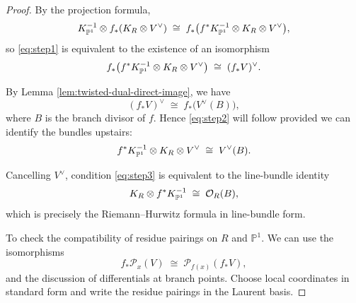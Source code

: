 \documentclass[12pt]{article}
\begin{document}
\begin{proof}
    By the projection formula,
    \[
        K_{\P^1}^{-1}\otimes f_*(K_R\otimes V^\vee)
        \;\cong\;
        f_*\bigl(f^*K_{\P^1}^{-1}\otimes K_R\otimes V^\vee\bigr),
    \]
    so \eqref{eq:step1} is equivalent to the existence of an isomorphism
    \begin{equation}\label{eq:step2}
        f_*\bigl(f^*K_{\P^1}^{-1}\otimes K_R\otimes V^\vee\bigr)
        \;\cong\;
        (f_*V)^\vee.
    \end{equation}

    By Lemma \ref{lem:twisted-dual-direct-image}, we have
    \[
        (f_*V)^\vee \;\cong\; f_*\bigl(V^\vee(B)\bigr),
    \]
    where $B$ is the branch divisor of $f$.
    Hence \eqref{eq:step2} will follow provided we can identify the bundles upstairs:
    \begin{equation}\label{eq:step3}
        f^*K_{\P^1}^{-1}\otimes K_R\otimes V^\vee
        \;\cong\;
        V^\vee(B).
    \end{equation}

    Cancelling $V^\vee$, condition \eqref{eq:step3} is equivalent to the line-bundle identity
    \begin{equation}\label{eq:RH}
        K_R\otimes f^*K_{\P^1}^{-1}
        \;\cong\;
        \cO_R(B),
    \end{equation}
    which is precisely the Riemann--Hurwitz formula in line-bundle form.

    To check the compatibility of residue pairings on $R$ and $\mathbb{P}^1$. We can use the isomorphisms
    \[
        f_*\mathcal{P}_x(V) \;\cong\; \mathcal{P}_{f(x)}(f_*V),
    \]
    and the discussion of differentials at branch points. Choose local coordinates in standard
    form and write the residue pairings in the Laurent basis.
\end{proof}
\end{document}
